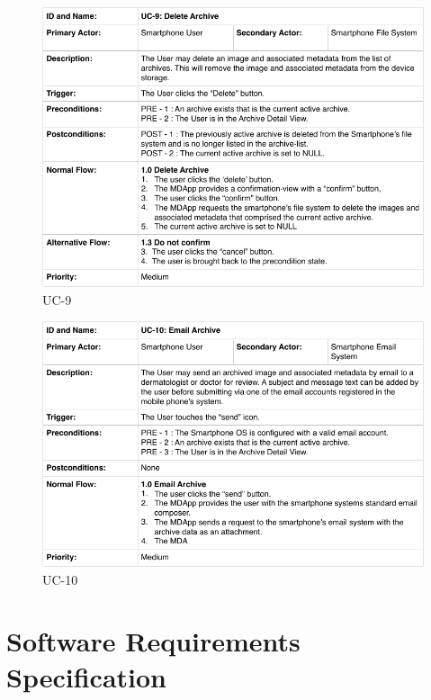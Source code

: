         \begin{figure}[H]
            \centering
            \includegraphics[width=\textwidth]{assets/requirements/uc/usecase_09.pdf}
            \caption{UC-9}
            \label{fig:uc-9}
        \end{figure}

        \begin{figure}[H]
            \centering
            \includegraphics[width=\textwidth]{assets/requirements/uc/usecase_10.pdf}
            \caption{UC-10}
            \label{fig:uc-10}
        \end{figure}

\section{Software Requirements Specification}

